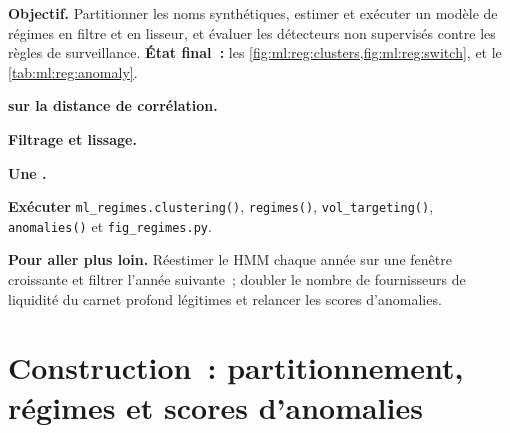 \begin{tutorial}
\textbf{Objectif.} Partitionner les noms synthétiques, estimer et exécuter un modèle de régimes en filtre et en lisseur, et évaluer les détecteurs non supervisés
contre les règles de surveillance. \textbf{État final~:} les \cref{fig:ml:reg:clusters,fig:ml:reg:switch},
et le \cref{tab:ml:reg:anomaly}.
\begin{tutsteps}
\item \textbf{ sur la distance de corrélation.}
\label{lst:ml:reg:hier}
\item \textbf{Filtrage et lissage.}
\label{lst:ml:reg:hmm}
\item \textbf{Une .}
\label{lst:ml:reg:iforest}
\item \textbf{Exécuter} \texttt{ml\_regimes.clustering()}, \texttt{regimes()}, \texttt{vol\_targeting()}, \texttt{anomalies()} et
\texttt{fig\_regimes.py}.
\end{tutsteps}
\textbf{Pour aller plus loin.} Réestimer le HMM chaque année sur une fenêtre croissante et filtrer l'année suivante~; doubler le nombre de
fournisseurs de liquidité du carnet profond légitimes et relancer les scores d'anomalies.
\end{tutorial}

\section{Construction~: partitionnement, régimes et scores d'anomalies}\label{bld:ml:clustering-regimes-and-anomaly-detection:regimes}

